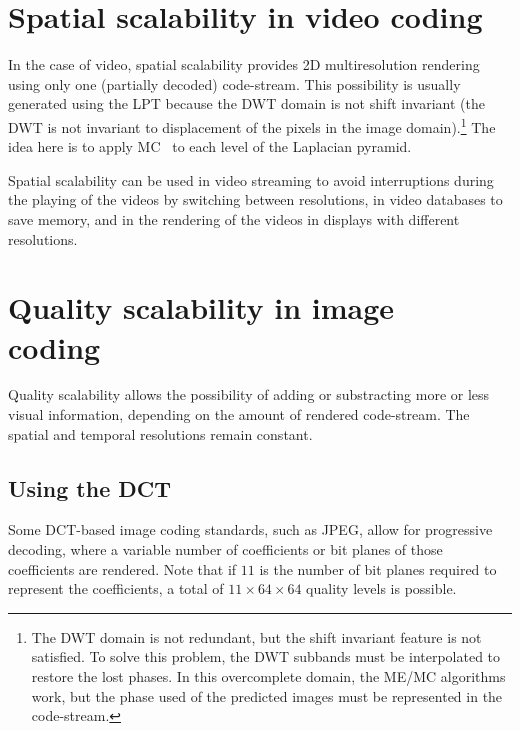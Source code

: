 
\section{Spatial scalability in video coding~\cite{vruiz__video_scalability}}


In the case of video, spatial scalability provides 2D multiresolution
rendering using only one (partially decoded) code-stream. This
possibility is usually generated using the LPT because the DWT domain
is not shift invariant (the DWT is not invariant to displacement of
the pixels in the image domain).\footnote{The DWT domain is not
  redundant, but the shift invariant feature is not satisfied. To
  solve this problem, the DWT subbands must be interpolated to restore
  the lost phases. In this overcomplete domain, the ME/MC algorithms
  work, but the phase used of the predicted images must be represented
  in the code-stream.} The idea here is to apply
MC~\cite{vruiz__MC} to each level of the Laplacian pyramid.

Spatial scalability can be used in video streaming to avoid
interruptions during the playing of the videos by switching between
resolutions, in video databases to save memory, and in the rendering
of the videos in displays with different resolutions.


\section{Quality scalability in image coding~\cite{vruiz__JPEG2000}}


Quality scalability allows the possibility of adding or substracting
more or less visual information, depending on the amount of rendered
code-stream. The spatial and temporal resolutions remain constant.

\subsection{Using the DCT}

Some DCT-based image coding standards, such as JPEG, allow for
progressive decoding, where a variable number of coefficients or
bit planes of those coefficients are rendered. Note that if $11$ is
the number of bit planes required to represent the coefficients, a
total of $11\times 64\times 64$ quality levels is possible.

